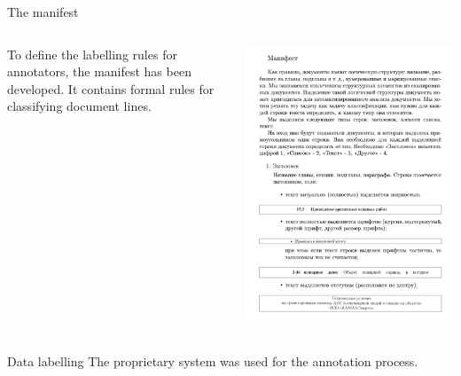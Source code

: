 \documentclass{beamer}
\begin{document}
\begin{frame}{The manifest}
    \begin{columns}
        \begin{column}{0.45\textwidth}
        To define the labelling rules for annotators, the manifest has been developed. It contains formal rules for classifying document lines.
        \end{column}
        \begin{column}{0.55\textwidth}
        \includegraphics[width=\textwidth]{pics/manifest.png}
        \end{column}
    \end{columns}
\end{frame}

\begin{frame}{Data labelling}
    The proprietary system was used for the annotation process.
\end{frame}
\end{document}
